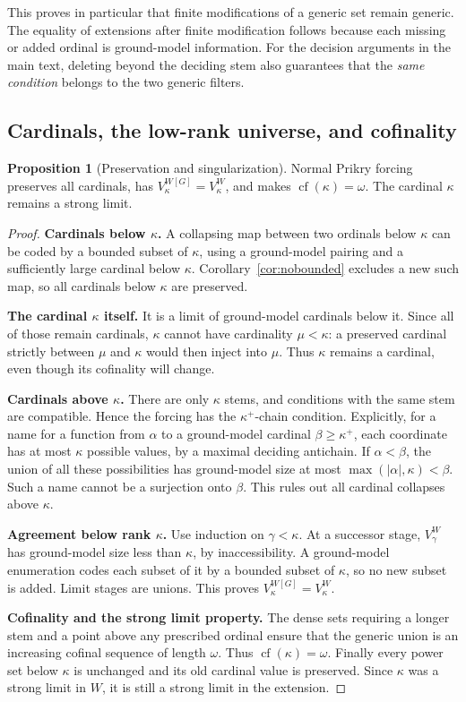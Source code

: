 \documentclass[11pt,letterpaper]{article}
\theoremstyle{definition}
\newtheorem{proposition}[definition]{Proposition}
\numberwithin{equation}{section}
\begin{document}
This proves in particular that finite modifications of a generic set remain generic. The equality of extensions after finite modification follows because each missing or added ordinal is ground-model information. For the decision arguments in the main text, deleting beyond the deciding stem also guarantees that the \emph{same condition} belongs to the two generic filters.

\subsection{Cardinals, the low-rank universe, and cofinality}

\begin{proposition}[Preservation and singularization]\label{prop:preservation}
Normal Prikry forcing preserves all cardinals, has $V_\kappa^{W[G]}=V_\kappa^W$, and makes $\operatorname{cf}(\kappa)=\omega$. The cardinal $\kappa$ remains a strong limit.
\end{proposition}
\begin{proof}
\textbf{Cardinals below $\kappa$.}
A collapsing map between two ordinals below $\kappa$ can be coded by a bounded subset of $\kappa$, using a ground-model pairing and a sufficiently large cardinal below $\kappa$. Corollary~\ref{cor:nobounded} excludes a new such map, so all cardinals below $\kappa$ are preserved.

\textbf{The cardinal $\kappa$ itself.}
It is a limit of ground-model cardinals below it. Since all of those remain cardinals, $\kappa$ cannot have cardinality $\mu<\kappa$: a preserved cardinal strictly between $\mu$ and $\kappa$ would then inject into $\mu$. Thus $\kappa$ remains a cardinal, even though its cofinality will change.

\textbf{Cardinals above $\kappa$.}
There are only $\kappa$ stems, and conditions with the same stem are compatible. Hence the forcing has the $\kappa^+$-chain condition. Explicitly, for a name for a function from $\alpha$ to a ground-model cardinal $\beta\ge\kappa^+$, each coordinate has at most $\kappa$ possible values, by a maximal deciding antichain. If $\alpha<\beta$, the union of all these possibilities has ground-model size at most $\max(|\alpha|,\kappa)<\beta$. Such a name cannot be a surjection onto $\beta$. This rules out all cardinal collapses above $\kappa$.

\textbf{Agreement below rank $\kappa$.}
Use induction on $\gamma<\kappa$. At a successor stage, $V_\gamma^W$ has ground-model size less than $\kappa$, by inaccessibility. A ground-model enumeration codes each subset of it by a bounded subset of $\kappa$, so no new subset is added. Limit stages are unions. This proves $V_\kappa^{W[G]}=V_\kappa^W$.

\textbf{Cofinality and the strong limit property.}
The dense sets requiring a longer stem and a point above any prescribed ordinal ensure that the generic union is an increasing cofinal sequence of length $\omega$. Thus $\operatorname{cf}(\kappa)=\omega$. Finally every power set below $\kappa$ is unchanged and its old cardinal value is preserved. Since $\kappa$ was a strong limit in $W$, it is still a strong limit in the extension.
\end{proof}
\end{document}

